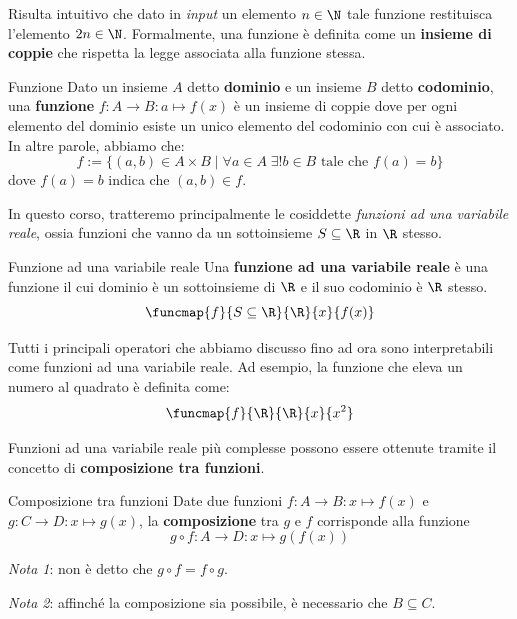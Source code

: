\documentclass[a4paper, 12pt]{report}
\begin{document}
    Risulta intuitivo che dato in \textit{input} un elemento $n \in \N$ tale funzione restituisca l'elemento $2n \in \N$. Formalmente, una funzione è definita come un \textbf{insieme di coppie} che rispetta la legge associata alla funzione stessa. 

    \begin{frameddefn}{Funzione}
        Dato un insieme $A$ detto \textbf{dominio} e un insieme $B$ detto \textbf{codominio}, una \textbf{funzione} $f : A \to B : a \mapsto f(x)$ è un insieme di coppie dove per ogni elemento del dominio esiste un unico elemento del codominio con cui è associato. In altre parole, abbiamo che:
        \[f := \{(a,b) \in A \times B \mid \forall a \in A \; \exists! b \in B \text{ tale che } f(a) = b\}\]
        dove $f(a) = b$ indica che $(a,b) \in f$.
    \end{frameddefn}

    In questo corso, tratteremo principalmente le cosiddette \textit{funzioni ad una variabile reale}, ossia funzioni che vanno da un sottoinsieme $S \subseteq \R$ in $\R$ stesso.

    \begin{frameddefn}{Funzione ad una variabile reale}
        Una \textbf{funzione ad una variabile reale} è una funzione il cui dominio è un sottoinsieme di $\R$ e il suo codominio è $\R$ stesso.
        \[\funcmap{f}{S \subseteq \R}{\R}{x}{f(x)}\]
    \end{frameddefn}

    Tutti i principali operatori che abbiamo discusso fino ad ora sono interpretabili come funzioni ad una variabile reale. Ad esempio, la funzione che eleva un numero al quadrato è definita come:
    \[\funcmap{f}{\R}{\R}{x}{x^2}\]
    
    Funzioni ad una variabile reale più complesse possono essere ottenute tramite il concetto di \textbf{composizione tra funzioni}. 

    \begin{frameddefn}{Composizione tra funzioni}
        Date due funzioni $f : A \to B : x \mapsto f(x)$ e $g: C \to D : x \mapsto g(x)$, la \textbf{composizione} tra $g$ e $f$ corrisponde alla funzione 
        \[g \circ f : A \to D : x \mapsto g(f(x))\]

        \textit{Nota 1}: non è detto che $g \circ f = f \circ g$.
        
        \textit{Nota 2}: affinché la composizione sia possibile, è necessario che $B \subseteq C$.
    \end{frameddefn}
\end{document}
